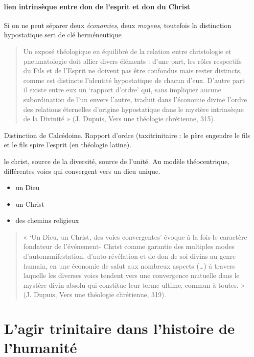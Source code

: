 \paragraph{lien intrinsèque entre don de l'esprit et don du Christ} Si on ne peut séparer deux \textit{économies}, deux \textit{moyens}, toutefois la distinction hypostatique sert de clé herméneutique
\begin{quote}
    Un exposé théologique en équilibré de la relation entre christologie et pneumatologie doit allier
divers éléments : d’une part, les rôles respectifs du Fils et de l’Esprit ne doivent pas être confondus
mais rester distincts, comme est distincte l’identité hypostatique de chacun d’eux. D’autre part il existe
entre eux un ‘rapport d’ordre’ qui, sans impliquer aucune subordination de l’un envers l’autre, traduit
dans l’économie divine l’ordre des relations éternelles d’origine hypostatique dans le mystère
intrinsèque de la Divinité » (J. Dupuis, Vers une théologie chrétienne, 315).
\end{quote}

Distinction de Calcédoine. Rapport d'ordre (taxitrinitaire : le père engendre le fils et le fils spire l'esprit (en théologie latine). 


le christ, source de la diversité, source de l'unité. Au modèle théocentrique, différentes voies qui convergent vers un dieu unique. 
\begin{itemize}
    \item un Dieu
    \item un Christ
    \item des chemins religieux
\end{itemize}

\begin{quote}
    « ‘Un Dieu, un Christ, des voies convergentes’ évoque à la fois le caractère fondateur de l’événement-
Christ comme garantie des multiples modes d’automanifestation, d’auto-révélation et de don de soi
divins au genre humain, en une économie de salut aux nombreux aspects (…) à travers laquelle les
diverses voies tendent vers une convergence mutuelle dans le mystère divin absolu qui constitue leur
terme ultime, commun à toutes. » (J. Dupuis, Vers une théologie chrétienne, 319).
\end{quote}

\section{L’agir trinitaire dans l’histoire de l’humanité}
